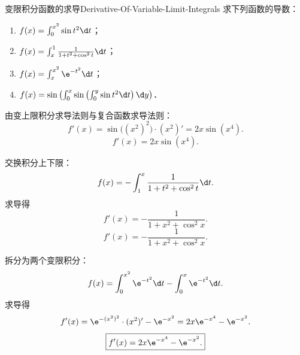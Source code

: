\begin{problem}{变限积分函数的求导}{Derivative-Of-Variable-Limit-Integrals}
    求下列函数的导数：
    \begin{enumerate}
        \item $f(x) = \int_0^{x^2} \sin t^2 \d t$；
        \item $f(x) = \int_x^1 \frac{1}{1 + t^2 + \cos^2 t} \d t$；
        \item $f(x) = \int_x^{x^2} \e^{-t^2} \d t$；
        \item $f(x) = \sin\left( \int_0^x \sin\left( \int_0^y \sin t^2 \d t \right) \d y \right)$．
    \end{enumerate}
\end{problem}

\begin{solution}

    由变上限积分求导法则与复合函数求导法则：
    \begin{equation}
        f'(x) = \sin\bigl((x^2)^2\bigr) \cdot (x^2)' = 2x \sin(x^4).
    \end{equation}
    \begin{equation}
        \boxed{f'(x) = 2x \sin(x^4).}
    \end{equation}


    交换积分上下限：
    \begin{equation}
        f(x) = -\int_1^x \frac{1}{1 + t^2 + \cos^2 t} \d t.
    \end{equation}
    求导得
    \begin{equation}
        f'(x) = -\frac{1}{1 + x^2 + \cos^2 x}.
    \end{equation}
    \begin{equation}
        \boxed{f'(x) = -\frac{1}{1 + x^2 + \cos^2 x}.}
    \end{equation}


    拆分为两个变限积分：
    \begin{equation}
        f(x) = \int_0^{x^2} \e^{-t^2} \d t - \int_0^x \e^{-t^2} \d t.
    \end{equation}
    求导得
    \begin{equation}
        f'(x) = \e^{-(x^2)^2} \cdot (x^2)' - \e^{-x^2} = 2x \e^{-x^4} - \e^{-x^2}.
    \end{equation}
    \begin{equation}
        \boxed{f'(x) = 2x \e^{-x^4} - \e^{-x^2}.}
    \end{equation}


\end{solution}
